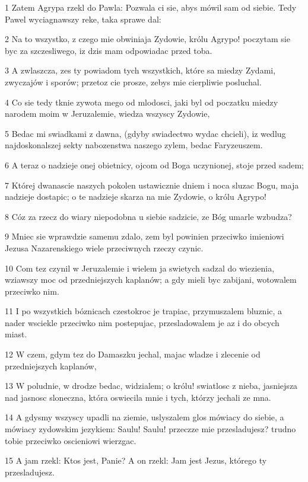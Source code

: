 \par 1 Zatem Agrypa rzekl do Pawla: Pozwala ci sie, abys mówil sam od siebie. Tedy Pawel wyciagnawszy reke, taka sprawe dal:
\par 2 Na to wszystko, z czego mie obwiniaja Zydowie, królu Agrypo! poczytam sie byc za szczesliwego, iz dzis mam odpowiadac przed toba.
\par 3 A zwlaszcza, zes ty powiadom tych wszystkich, które sa miedzy Zydami, zwyczajów i sporów; przetoz cie prosze, zebys mie cierpliwie posluchal.
\par 4 Co sie tedy tknie zywota mego od mlodosci, jaki byl od poczatku miedzy narodem moim w Jeruzalemie, wiedza wszyscy Zydowie,
\par 5 Bedac mi swiadkami z dawna, (gdyby swiadectwo wydac chcieli), iz wedlug najdoskonalszej sekty nabozenstwa naszego zylem, bedac Faryzeuszem.
\par 6 A teraz o nadzieje onej obietnicy, ojcom od Boga uczynionej, stoje przed sadem;
\par 7 Której dwanascie naszych pokolen ustawicznie dniem i noca sluzac Bogu, maja nadzieje dostapic; o te nadzieje skarza na mie Zydowie, o królu Agrypo!
\par 8 Cóz za rzecz do wiary niepodobna u siebie sadzicie, ze Bóg umarle wzbudza?
\par 9 Mniec sie wprawdzie samemu zdalo, zem byl powinien przeciwko imieniowi Jezusa Nazarenskiego wiele przeciwnych rzeczy czynic.
\par 10 Com tez czynil w Jeruzalemie i wielem ja swietych sadzal do wiezienia, wziawszy moc od przedniejszych kaplanów; a gdy mieli byc zabijani, wotowalem przeciwko nim.
\par 11 I po wszystkich bóznicach czestokroc je trapiac, przymuszalem bluznic, a nader wsciekle przeciwko nim postepujac, przesladowalem je az i do obcych miast.
\par 12 W czem, gdym tez do Damaszku jechal, majac wladze i zlecenie od przedniejszych kaplanów,
\par 13 W poludnie, w drodze bedac, widzialem; o królu! swiatlosc z nieba, jasniejsza nad jasnosc sloneczna, która oswiecila mnie i tych, którzy jechali ze mna.
\par 14 A gdysmy wszyscy upadli na ziemie, uslyszalem glos mówiacy do siebie, a mówiacy zydowskim jezykiem: Saulu! Saulu! przeczze mie przesladujesz? trudno tobie przeciwko oscieniowi wierzgac.
\par 15 A jam rzekl: Ktos jest, Panie? A on rzekl: Jam jest Jezus, którego ty przesladujesz.
